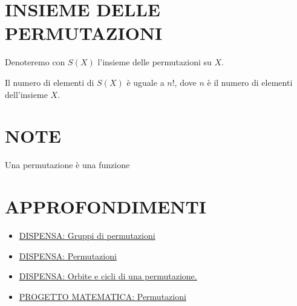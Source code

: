 \documentclass[a4paper,10pt]{article}
\begin{document}
\section{INSIEME DELLE PERMUTAZIONI}
Denoteremo con $S(X)$ l'insieme delle permutazioni su $X$. \cite{permutazione1}

Il numero di elementi di $S(X)$ è uguale a $n!$, dove $n$ è il numero di elementi dell'insieme $X$.

\section{NOTE}
Una permutazione è una funzione

\section{APPROFONDIMENTI}
\begin{itemize}
 \item \href{./pdf/PERMUTAZIONE/lezione4.pdf}{DISPENSA: Gruppi di permutazioni} \cite{permutazione1}
 \item \href{./pdf/PERMUTAZIONE/permutazioni.pdf}{DISPENSA: Permutazioni} \cite{permutazione2}
 \item \href{http://www.dm.uniba.it/~barile/Rete4/algebra1_pdf/lezione18.pdf}{DISPENSA: Orbite e cicli di una permutazione.} \cite{permutazione4}
 \item \href{http://progettomatematica.dm.unibo.it/Permutazioni/homepg.htm}{PROGETTO MATEMATICA: Permutazioni} \cite{permutazione3}
\end{itemize}




\end{document}
